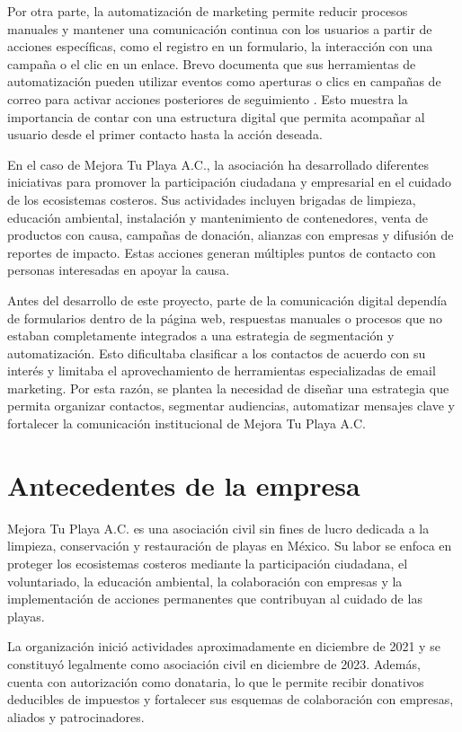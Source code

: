 Por otra parte, la automatización de marketing permite reducir procesos manuales y mantener una comunicación continua con los usuarios a partir de acciones específicas, como el registro en un formulario, la interacción con una campaña o el clic en un enlace. Brevo documenta que sus herramientas de automatización pueden utilizar eventos como aperturas o clics en campañas de correo para activar acciones posteriores de seguimiento \cite{brevo_automation_clicks}. Esto muestra la importancia de contar con una estructura digital que permita acompañar al usuario desde el primer contacto hasta la acción deseada.

En el caso de Mejora Tu Playa A.C., la asociación ha desarrollado diferentes iniciativas para promover la participación ciudadana y empresarial en el cuidado de los ecosistemas costeros. Sus actividades incluyen brigadas de limpieza, educación ambiental, instalación y mantenimiento de contenedores, venta de productos con causa, campañas de donación, alianzas con empresas y difusión de reportes de impacto. Estas acciones generan múltiples puntos de contacto con personas interesadas en apoyar la causa.

Antes del desarrollo de este proyecto, parte de la comunicación digital dependía de formularios dentro de la página web, respuestas manuales o procesos que no estaban completamente integrados a una estrategia de segmentación y automatización. Esto dificultaba clasificar a los contactos de acuerdo con su interés y limitaba el aprovechamiento de herramientas especializadas de email marketing. Por esta razón, se plantea la necesidad de diseñar una estrategia que permita organizar contactos, segmentar audiencias, automatizar mensajes clave y fortalecer la comunicación institucional de Mejora Tu Playa A.C.

\section{Antecedentes de la empresa}

Mejora Tu Playa A.C. es una asociación civil sin fines de lucro dedicada a la limpieza, conservación y restauración de playas en México. Su labor se enfoca en proteger los ecosistemas costeros mediante la participación ciudadana, el voluntariado, la educación ambiental, la colaboración con empresas y la implementación de acciones permanentes que contribuyan al cuidado de las playas.

La organización inició actividades aproximadamente en diciembre de 2021 y se constituyó legalmente como asociación civil en diciembre de 2023. Además, cuenta con autorización como donataria, lo que le permite recibir donativos deducibles de impuestos y fortalecer sus esquemas de colaboración con empresas, aliados y patrocinadores.

